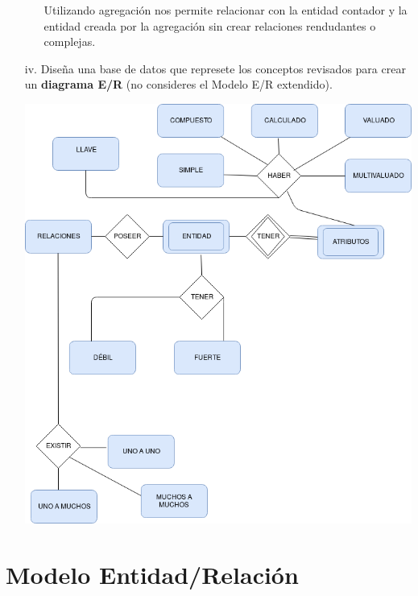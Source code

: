 \documentclass[letterpaper,11pt]{article}
\begin{document}
\begin{itemize}
\begin{itemize}
            Utilizando agregación nos permite relacionar  con la entidad
            contador y la entidad creada por la agregación sin crear
            relaciones rendudantes o complejas.

        \end{itemize}

    \item[iv.] Diseña una base de datos que represete los conceptos revisados
    para crear un \textbf{diagrama E/R} (no consideres el Modelo E/R extendido).

          \includegraphics[width= 10 cm]{imagenes/iv.png}

\end{itemize}

\section{Modelo Entidad/Relación}
\end{document}
